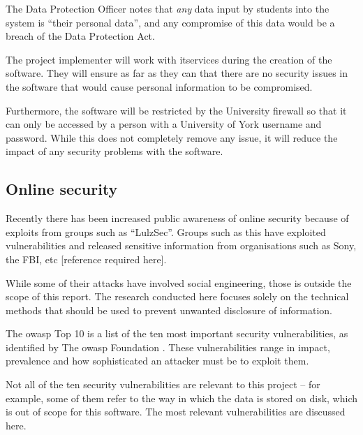 \documentclass[draft]{scrartcl}
\begin{document}

The Data Protection Officer notes that \emph{any} data input by students into the
system is ``their personal data'', and any compromise of this data would be a
breach of the Data Protection Act.

The project implementer will work with \gls{itservices} during the creation of
the software. They will ensure as far as they can that there are no security
issues in the software that would cause personal information to be compromised.

Furthermore, the software will be restricted by the University firewall so
that it can only be accessed by a person with a University of York username
and password. While this does not completely remove any issue, it will reduce
the impact of any security problems with the software.

\subsection{Online security}

Recently there has been increased public awareness of online security because
of exploits from groups such as ``LulzSec''. Groups such as this have
exploited vulnerabilities and released sensitive information from
organisations such as Sony, the FBI, etc [reference required here].

While some of their attacks have involved social engineering, those is outside
the scope of this report. The research conducted here focuses solely on the
technical methods that should be used to prevent unwanted disclosure of
information.

The \gls{owasp} Top 10 is a list of the ten most important security
vulnerabilities, as identified by The \gls{owasp} Foundation
\cite{OWASPTop10_2010}. These vulnerabilities range in impact, prevalence and
how sophisticated an attacker must be to exploit them.

Not all of the ten security vulnerabilities are relevant to this project --
for example, some of them refer to the way in which the data is stored on
disk, which is out of scope for this software. The most relevant
vulnerabilities are discussed here.



\end{document}
